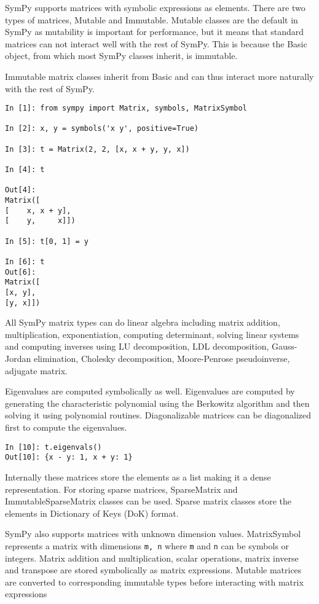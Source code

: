 

SymPy supports matrices with symbolic expressions as elements. There are two
types of matrices, Mutable and Immutable. Mutable classes are the default in
SymPy as mutability is important for performance, but it means that standard
matrices can not interact well with the rest of SymPy. This is because the
Basic object, from which most SymPy classes inherit, is immutable.

Immutable matrix classes inherit from Basic and can thus interact more
naturally with the rest of SymPy.

\begin{verbatim}
In [1]: from sympy import Matrix, symbols, MatrixSymbol

In [2]: x, y = symbols('x y', positive=True)

In [3]: t = Matrix(2, 2, [x, x + y, y, x])

In [4]: t

Out[4]:
Matrix([
[    x, x + y],
[    y,     x]])

In [5]: t[0, 1] = y

In [6]: t
Out[6]:
Matrix([
[x, y],
[y, x]])
\end{verbatim}

All SymPy matrix types can do linear algebra including matrix addition,
multiplication, exponentiation, computing determinant, solving linear
systems and computing inverses using LU decomposition, LDL decomposition,
Gauss-Jordan elimination, Cholesky decomposition, Moore-Penrose pseudoinverse,
adjugate matrix.

Eigenvalues are computed symbolically as well. Eigenvalues are computed by
generating the characteristic polynomial using the Berkowitz algorithm and
then solving it using polynomial routines. Diagonalizable matrices can be
diagonalized first to compute the eigenvalues.

\begin{verbatim}
In [10]: t.eigenvals()
Out[10]: {x - y: 1, x + y: 1}
\end{verbatim}

Internally these matrices store the elements as a list making it a dense
representation. For storing sparse matrices, SparseMatrix and 
ImmutableSparseMatrix classes can be used. Sparse matrix classes store
the elements in Dictionary of Keys (DoK) format.

SymPy also supports matrices with unknown dimension values. MatrixSymbol
represents a matrix with dimensions \verb|m, n| where \verb|m| and \verb|n|
can be symbols or integers. Matrix addition and multiplication, scalar
operations, matrix inverse and transpose are stored symbolically as
matrix expressions. Mutable matrices are converted to corresponding immutable
types before interacting with matrix expressions

